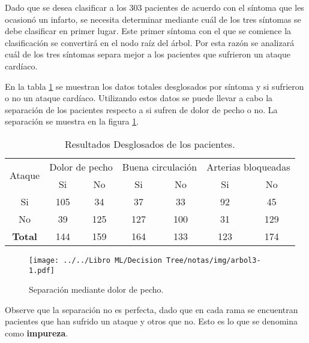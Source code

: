 \documentclass[
10pt, %
a4paper, %
]{article}
\begin{document}
Dado que se desea clasificar a los 303 pacientes de acuerdo con el síntoma que les ocasionó un infarto, se necesita determinar mediante cuál de los tres síntomas 
se debe clasificar en primer lugar. Este primer síntoma con el que se comience la clasificación se convertirá en el nodo raíz del árbol. Por esta razón se 
analizará cuál de los tres síntomas separa mejor a los pacientes que sufrieron un ataque cardíaco. 

En la tabla \ref{tab:datosTotalesDesglosados} se muestran los datos totales desglosados por síntoma y si sufrieron o no un ataque cardíaco. Utilizando estos datos se
puede llevar a cabo la separación de los pacientes respecto a si sufren de dolor de pecho o no. La separación se muestra en la figura \ref{fig:arbol3-1}.

\begin{table}
  \centering
  \begin{tabular}{c||cc|cc|cc}
    \toprule
    \multirow{2}{*}{Ataque} & \multicolumn{2}{c}{Dolor de pecho} & \multicolumn{2}{c}{Buena circulación} & \multicolumn{2}{c}{Arterias bloqueadas} \\  
                            & Si               & No              & Si                & No                & Si                 & No                 \\ \midrule
    Si                      & 105              & 34              & 37                & 33                & 92                 & 45                 \\ \midrule
    No                      & 39               & 125             & 127               & 100               & 31                 & 129                \\ \midrule\midrule
    \textbf{Total}          & 144              & 159             & 164               & 133               & 123                & 174                \\ 
    \bottomrule
  \end{tabular}
  \caption{Resultados Desglosados de los pacientes.}
  \label{tab:datosTotalesDesglosados}
\end{table}


\begin{figure}[H]
	\centering
	\texttt{[image: ../../Libro ML/Decision Tree/notas/img/arbol3-1.pdf]}
	\caption{Separación mediante dolor de pecho.}
	\label{fig:arbol3-1}
\end{figure}

Observe que la separación no es perfecta, dado que en cada rama se encuentran pacientes que han sufrido un ataque y otros que no. Esto es lo que se denomina 
como \textbf{impureza}.
\end{document}
